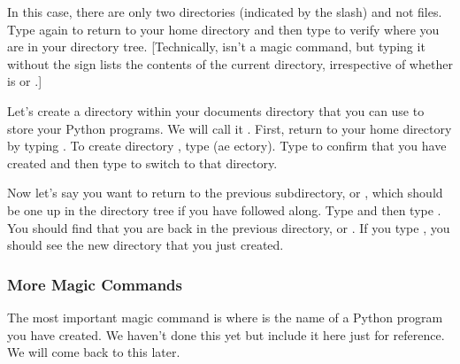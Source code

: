 \documentclass[letterpaper,10pt,english]{sphinxmanual}
\begin{document}
\begin{sphinxVerbatim}[commandchars=\\\{\}]
\end{sphinxVerbatim}

\sphinxAtStartPar
In this case, there are only two directories (indicated by the slash) and not files.  Type  again to return to your home directory and then type  to verify where you are in your directory tree.  {[}Technically,  isn’t a magic command, but typing it without the \sphinxcode{\sphinxupquote{\%}} sign lists the contents of the current directory, irrespective of whether  is  or .{]}

\sphinxAtStartPar
Let’s create a directory within your documents directory that you can use to store your Python programs.  We will call it .  First, return to your home directory by typing .  To create directory , type  (ae ectory).  Type  to confirm that you have created  and then type  to switch to that directory.

\sphinxAtStartPar
Now let’s say you want to return to the previous subdirectory,  or , which should be one up in the directory tree if you have followed along.  Type  and then type .  You should find that you are back in the previous directory,  or .  If you type , you should see the new directory  that you just created.


\subsubsection{More Magic Commands}
\label{\detokenize{chap2/chap2_basics:more-magic-commands}}
\ignorespaces 
\sphinxAtStartPar
The most important magic command is   where  is the name of a Python program you have created.  We haven’t done this yet but include it here just for reference.  We will come back to this later.
\end{document}
